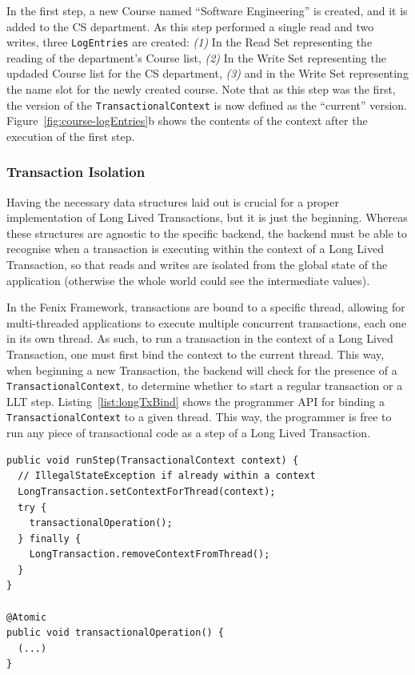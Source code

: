 \documentclass{llncs}
\begin{document}
In the first step, a new Course named ``Software Engineering'' is
created, and it is added to the CS department. As this step performed
a single read and two writes, three \texttt{LogEntries} are created:
{\it (1)} In the Read Set representing the reading of the department's
Course list, {\it (2)} In the Write Set representing the updaded
Course list for the CS department, {\it (3)} and in the Write Set
representing the name slot for the newly created course.  Note that as
this step was the first, the version of the
\texttt{TransactionalContext} is now defined as the ``current''
version. Figure~\ref{fig:course-logEntries}b shows the contents of the
context after the execution of the first step.

\subsubsection{Transaction Isolation}

Having the necessary data structures laid out is crucial for a proper
implementation of Long Lived Transactions, but it is just the
beginning. Whereas these structures are agnostic to the specific
backend, the backend must be able to recognise when a transaction is
executing within the context of a Long Lived Transaction, so that
reads and writes are isolated from the global state of the application
(otherwise the whole world could see the intermediate values).

In the Fenix Framework, transactions are bound to a specific thread,
allowing for multi-threaded applications to execute multiple
concurrent transactions, each one in its own thread. As such, to run a
transaction in the context of a Long Lived Transaction, one must first
bind the context to the current thread. This way, when beginning a new
Transaction, the backend will check for the presence of a
\texttt{TransactionalContext}, to determine whether to start a regular
transaction or a LLT step. Listing~\ref{list:longTxBind} shows the
programmer API for binding a \texttt{TransactionalContext} to a given
thread. This way, the programmer is free to run any piece of
transactional code as a step of a Long Lived Transaction.

\begin{lstlisting}[caption={Example of TransactionalContext usage},
  label={list:longTxBind},float]
public void runStep(TransactionalContext context) {
  // IllegalStateException if already within a context
  LongTransaction.setContextForThread(context);
  try {
    transactionalOperation();
  } finally {
    LongTransaction.removeContextFromThread();
  }
}

@Atomic
public void transactionalOperation() {
  (...)
}
\end{lstlisting}
\end{document}
